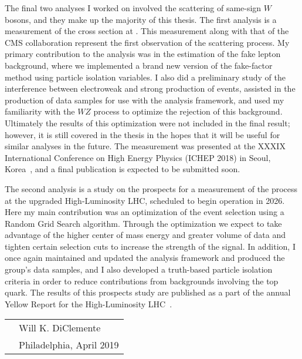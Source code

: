 The final two analyses I worked on involved the scattering of same-sign $W$ bosons, and they make up the majority of this thesis.
The first analysis is a measurement of the \ssww cross section at .
This measurement along with that of the CMS collaboration represent the first observation of the \ssww scattering process.
My primary contribution to the analysis was in the estimation of the fake lepton background, where we implemented a brand new version of the fake-factor method using particle isolation variables.
I also did a preliminary study of the interference between electroweak and strong production of \ssww events, assisted in the production of data samples for use with the analysis framework, and used my familiarity with the $WZ$ process to optimize the rejection of this background.
Ultimately the results of this optimization were not included in the final result; however, it is still covered in the thesis in the hopes that it will be useful for similar analyses in the future.
The measurement was presented at the XXXIX International Conference on High Energy Physics (ICHEP 2018) in Seoul, Korea~\cite{2018.ssww-13tev-atlas-conf}, and a final publication is expected to be submitted soon.

The second \ssww analysis is a study on the prospects for a measurement of the process at the upgraded High-Luminosity LHC, scheduled to begin operation in 2026.
Here my main contribution was an optimization of the event selection using a Random Grid Search algorithm.
Through the optimization we expect to take advantage of the higher center of mass energy and greater volume of data and tighten certain selection cuts to increase the strength of the \ssww signal.
In addition, I once again maintained and updated the analysis framework and produced the group's data samples, and I also developed a truth-based particle isolation criteria in order to reduce contributions from backgrounds involving the top quark.
The results of this prospects study are published as a part of the annual Yellow Report for the High-Luminosity LHC~\cite{2019.yellow-report-arxiv}.


\begin{tabular}{p{} l}
  & Will K. DiClemente           \\
  & Philadelphia, April 2019  \\
\end{tabular}

